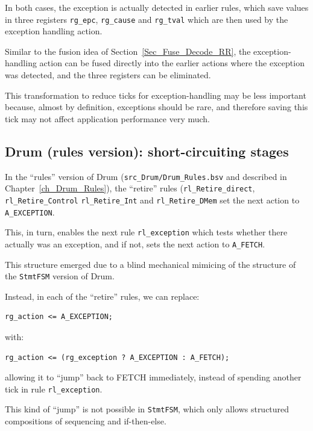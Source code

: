 In both cases, the exception is actually detected in earlier rules,
which save values in three registers \verb|rg_epc|, \verb|rg_cause|
and \verb|rg_tval| which are then used by the exception handling
action.

Similar to the fusion idea of Section~\ref{Sec_Fuse_Decode_RR}, the
exception-handling action can be fused directly into the earlier
actions where the exception was detected, and the three registers can
be eliminated.

This transformation to reduce ticks for exception-handling may be less
important because, almost by definition, exceptions should be rare,
and therefore saving this tick may not affect application performance
very much.


\subsection{Drum (rules version): short-circuiting stages}

In the ``rules'' version of Drum (\verb|src_Drum/Drum_Rules.bsv| and
described in Chapter~\ref{ch_Drum_Rules}), the ``retire'' rules
(\verb|rl_Retire_direct|, \verb|rl_Retire_Control|
\verb|rl_Retire_Int| and \verb|rl_Retire_DMem| set the next action to
\verb|A_EXCEPTION|.

This, in turn, enables the next rule \verb|rl_exception| which tests
whether there actually was an exception, and if not, sets the next
action to \verb|A_FETCH|.

This structure emerged due to a blind mechanical mimicing of the
structure of the \verb|StmtFSM| version of Drum.

Instead, in each of the ``retire'' rules, we can replace:

{\small
\begin{Verbatim}[frame=single]
      rg_action <= A_EXCEPTION;
\end{Verbatim}
}

with:

{\small
\begin{Verbatim}[frame=single]
      rg_action <= (rg_exception ? A_EXCEPTION : A_FETCH);
\end{Verbatim}
}

allowing it to ``jump'' back to FETCH immediately, instead of spending
another tick in rule \verb|rl_exception|.

This kind of ``jump'' is not possible in \verb|StmtFSM|, which only
allows structured compositions of sequencing and if-then-else.

